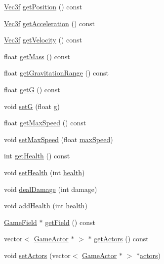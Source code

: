 \begin{DoxyCompactItemize}
\item 
\hyperlink{class_vec3f}{Vec3f} \hyperlink{class_game_actor_a8a0ca1b6866225d66df2381649bdc601}{get\+Position} () const 
\item 
\hyperlink{class_vec3f}{Vec3f} \hyperlink{class_game_actor_aa50b1f399dc19a4dd62995641465cbd2}{get\+Acceleration} () const 
\item 
\hyperlink{class_vec3f}{Vec3f} \hyperlink{class_game_actor_a1f624837eac0fe9fe80bcb54cfe8b1cf}{get\+Velocity} () const 
\item 
float \hyperlink{class_game_actor_ac19034996d2c622f4f2fd5870d43c9cd}{get\+Mass} () const 
\item 
float \hyperlink{class_game_actor_adb2e41937471e0f7377a188f399684cf}{get\+Gravitation\+Range} () const 
\item 
float \hyperlink{class_game_actor_a7fafd913a7b0f93d66f7335c8e8417f9}{get\+G} () const 
\item 
void \hyperlink{class_game_actor_af3fbd8b984fdd0df93cc4c6f342caa5e}{set\+G} (float \hyperlink{class_game_actor_a42ed4bef0d99cf053ff9a025c86d34d3}{g})
\item 
float \hyperlink{class_game_actor_a13cec4e211c56989b4ef58ead7c31e17}{get\+Max\+Speed} () const 
\item 
void \hyperlink{class_game_actor_a33f79600c44e3372a23c3ca2ee880704}{set\+Max\+Speed} (float \hyperlink{class_game_actor_a15b6abd006c52b21c569932f8b484eb0}{max\+Speed})
\item 
int \hyperlink{class_game_actor_a0e29a446b3247da54893ef12faa9eaaa}{get\+Health} () const 
\item 
void \hyperlink{class_game_actor_ace7f2c9f95ac3c39acbb88a3c31240b4}{set\+Health} (int \hyperlink{class_game_actor_a5d402a953140585fb7cc3f8a3a24a2a4}{health})
\item 
void \hyperlink{class_game_actor_a168ddb4dda02a8dd734f35d61e325de9}{deal\+Damage} (int damage)
\item 
void \hyperlink{class_game_actor_a911133767a09fc1247b460b6431b7d3d}{add\+Health} (int \hyperlink{class_game_actor_a5d402a953140585fb7cc3f8a3a24a2a4}{health})
\item 
\hyperlink{class_game_field}{Game\+Field} $\ast$ \hyperlink{class_game_actor_a34e8fa1fcd5febba5f9c92817a24583d}{get\+Field} () const 
\item 
vector$<$ \hyperlink{class_game_actor}{Game\+Actor} $\ast$ $>$ $\ast$ \hyperlink{class_game_actor_ad5717fb691f64dbfd6d05d8ab62a0e44}{get\+Actors} () const 
\item 
void \hyperlink{class_game_actor_ab8d3dd08796d2459f7d377b143197bf0}{set\+Actors} (vector$<$ \hyperlink{class_game_actor}{Game\+Actor} $\ast$ $>$ $\ast$\hyperlink{class_game_actor_a2405618d895f5143b42ae9e94d20e693}{actors})

\end{DoxyCompactItemize}
